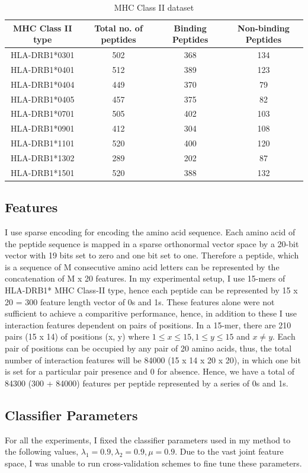 \documentclass[conference,10pt,draftclsnofoot,onecolumn]{IEEEtran}
\begin{document}
\begin{table}[!t]
\caption{MHC Class II dataset}
\label{tab:dataset}
\centering
\begin{tabular}{|c||c||c||c|}
\hline
MHC Class II type & Total no. of peptides & Binding Peptides & Non-binding Peptides\\
\hline
HLA-DRB1*0301 & 502 & 368 & 134\\
\hline
HLA-DRB1*0401 & 512 & 389 & 123\\
\hline
HLA-DRB1*0404 & 449 & 370 & 79\\
\hline
HLA-DRB1*0405 & 457 & 375 & 82\\
\hline
HLA-DRB1*0701 & 505 & 402 & 103\\
\hline
HLA-DRB1*0901 & 412 & 304 & 108\\
\hline
HLA-DRB1*1101 & 520 & 400 & 120\\
\hline
HLA-DRB1*1302 & 289 & 202 & 87\\
\hline
HLA-DRB1*1501 & 520 & 388 & 132\\
\hline
\end{tabular}
\end{table}

\subsection{Features}
\label{subsec:features}
I use sparse encoding \cite{qian88} for encoding the amino acid sequence. Each amino acid of the peptide sequence is mapped in a sparse orthonormal vector space by a 20-bit vector with 19 bits set to zero and one bit set to one. Therefore a peptide, which is a sequence of M consecutive amino acid letters can be represented by the concatenation of M x 20 features. In my experimental setup, I use 15-mers of HLA-DRB1* MHC Class-II type, hence each peptide can be represented by 15 x 20 = 300 feature length vector of 0s and 1s. These features alone were not sufficient to achieve a comparitive performance, hence, in addition to these I use interaction features dependent on pairs of positions. In a 15-mer, there are 210 pairs (15 x 14) of positions (x, y) where $1 \le x \le 15, 1 \le y \le 15$ and $x \ne y$. Each pair of positions can be occupied by any pair of 20 amino acids, thus, the total number of interaction features will be 84000 (15 x 14 x 20 x 20), in which one bit is set for a particular pair presence and 0 for absence. Hence, we have a total of 84300 (300 + 84000) features per peptide represented by a series of 0s and 1s.

\subsection{Classifier Parameters}
\label{subsec:params}
For all the experiments, I fixed the classifier parameters used in my method to the following values, $\lambda_1 = 0.9, \lambda_2 = 0.9, \mu = 0.9$. Due to the vast joint feature space, I was unable to run cross-validation schemes to fine tune these parameters.
\end{document}
